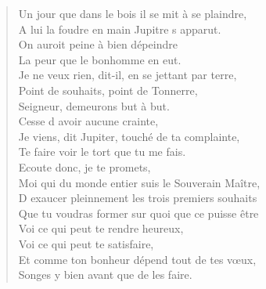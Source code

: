 \begin{verse}
Un jour que dans le bois il se mit à se plaindre, \\
A lui la foudre en main Jupitre s\textquotesingle{} apparut. \\
\vin On auroit peine à bien dépeindre \\
\vin La peur que le bonhomme en eut. \\
Je ne veux rien, dit-il, en se jettant par terre, \\
\vin Point de souhaits, point de Tonnerre, \\
\vin Seigneur, demeurons but à but. \\
\vin Cesse d\textquotesingle{} avoir aucune crainte, \\
Je viens, dit Jupiter, touché de ta complainte, \\
\vin Te faire voir le tort que tu me fais. \\
\vin Ecoute donc, je te promets, \\
Moi qui du monde entier suis le Souverain Maître, \\
D\textquotesingle{} exaucer pleinnement les trois premiers souhaits \\
Que tu voudras former sur quoi que ce puisse être \\
\vin Voi ce qui peut te rendre heureux, \\
\vin Voi ce qui peut te satisfaire, \\
Et comme ton bonheur dépend tout de tes vœux, \\
\vin Songes y bien avant que de les faire.


\end{verse}
